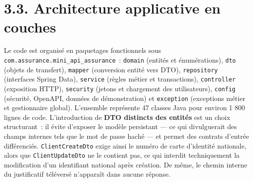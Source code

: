 \documentclass[12pt,a4paper]{report}
\begin{document}
\section*{3.3. Architecture applicative en couches}
Le code est organisé en paquetages fonctionnels sous \texttt{com.assurance.mini\_api\_assurance}~: \texttt{domain} (entités et énumérations), \texttt{dto} (objets de transfert), \texttt{mapper} (conversion entité vers DTO), \texttt{repository} (interfaces Spring Data), \texttt{service} (règles métier et transactions), \texttt{controller} (exposition HTTP), \texttt{security} (jetons et chargement des utilisateurs), \texttt{config} (sécurité, OpenAPI, données de démonstration) et \texttt{exception} (exceptions métier et gestionnaire global). L'ensemble représente 47 classes Java pour environ 1 800 lignes de code.
L'introduction de \textbf{DTO distincts des entités} est un choix structurant~: il évite d'exposer le modèle persistant — ce qui divulguerait des champs internes tels que le mot de passe haché — et permet des contrats d'entrée différenciés. \texttt{ClientCreateDto} exige ainsi le numéro de carte d'identité nationale, alors que \texttt{ClientUpdateDto} ne le contient pas, ce qui interdit techniquement la modification d'un identifiant national après création. De même, le chemin interne du justificatif téléversé n'apparaît dans aucune réponse.
\end{document}
